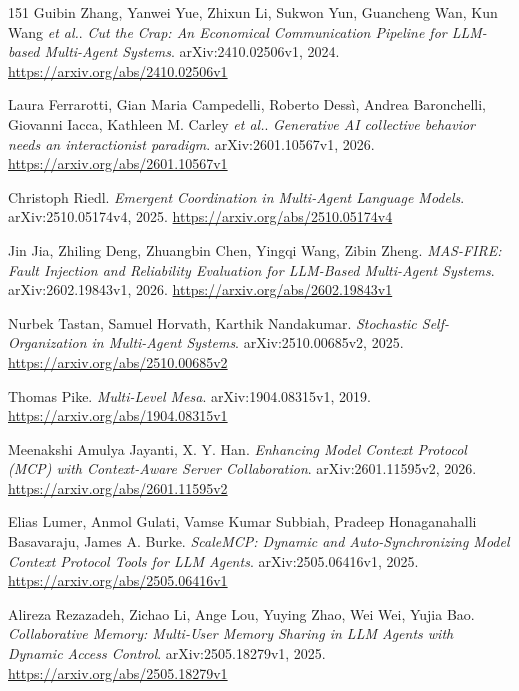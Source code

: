 \documentclass[11pt,a4paper]{article}
\begin{document}
\begin{thebibliography}{151}
Guibin Zhang, Yanwei Yue, Zhixun Li, Sukwon Yun, Guancheng Wan, Kun Wang \emph{et al.}.
\newblock \emph{Cut the Crap: An Economical Communication Pipeline for LLM-based Multi-Agent Systems}.
\newblock arXiv:2410.02506v1, 2024.
\newblock \url{https://arxiv.org/abs/2410.02506v1}

Laura Ferrarotti, Gian Maria Campedelli, Roberto Dess\`{i}, Andrea Baronchelli, Giovanni Iacca, Kathleen M. Carley \emph{et al.}.
\newblock \emph{Generative AI collective behavior needs an interactionist paradigm}.
\newblock arXiv:2601.10567v1, 2026.
\newblock \url{https://arxiv.org/abs/2601.10567v1}

Christoph Riedl.
\newblock \emph{Emergent Coordination in Multi-Agent Language Models}.
\newblock arXiv:2510.05174v4, 2025.
\newblock \url{https://arxiv.org/abs/2510.05174v4}

Jin Jia, Zhiling Deng, Zhuangbin Chen, Yingqi Wang, Zibin Zheng.
\newblock \emph{MAS-FIRE: Fault Injection and Reliability Evaluation for LLM-Based Multi-Agent Systems}.
\newblock arXiv:2602.19843v1, 2026.
\newblock \url{https://arxiv.org/abs/2602.19843v1}

Nurbek Tastan, Samuel Horvath, Karthik Nandakumar.
\newblock \emph{Stochastic Self-Organization in Multi-Agent Systems}.
\newblock arXiv:2510.00685v2, 2025.
\newblock \url{https://arxiv.org/abs/2510.00685v2}

Thomas Pike.
\newblock \emph{Multi-Level Mesa}.
\newblock arXiv:1904.08315v1, 2019.
\newblock \url{https://arxiv.org/abs/1904.08315v1}

Meenakshi Amulya Jayanti, X. Y. Han.
\newblock \emph{Enhancing Model Context Protocol (MCP) with Context-Aware Server Collaboration}.
\newblock arXiv:2601.11595v2, 2026.
\newblock \url{https://arxiv.org/abs/2601.11595v2}

Elias Lumer, Anmol Gulati, Vamse Kumar Subbiah, Pradeep Honaganahalli Basavaraju, James A. Burke.
\newblock \emph{ScaleMCP: Dynamic and Auto-Synchronizing Model Context Protocol Tools for LLM Agents}.
\newblock arXiv:2505.06416v1, 2025.
\newblock \url{https://arxiv.org/abs/2505.06416v1}

Alireza Rezazadeh, Zichao Li, Ange Lou, Yuying Zhao, Wei Wei, Yujia Bao.
\newblock \emph{Collaborative Memory: Multi-User Memory Sharing in LLM Agents with Dynamic Access Control}.
\newblock arXiv:2505.18279v1, 2025.
\newblock \url{https://arxiv.org/abs/2505.18279v1}


\end{thebibliography}
\end{document}
